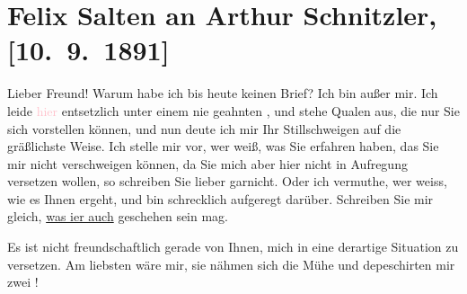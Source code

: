 

\renewcommand{\erwaehntePersonen}{Personen: Bertha Karlsburg}
\renewcommand{\erwaehnteOrte}{Orte: Hotel Stadt Pest, Miskolc, Wien}
\renewcommand{\erwaehnteWerke}{}
\section[Felix Salten an Arthur Schnitzler, {[}10. 9. 1891{]}]{Felix Salten an Arthur Schnitzler, {[}10. 9. 1891{]}}
\nopagebreak{}
\rehead{ }\normalsize\beginnumbering{}
\toendnotes[C]{\smallbreak\pagebreak[2]}
\toendnotes[C]{\smallbreak}
\pstart
           \noindent{}{\pb}Lieber Freund! Warum habe ich bis heute keinen Brief? Ich bin außer mir. Ich leide \textcolor{pink}{hier}{}\ledrightnote{{$\rightarrow$}\textcolor{pink}{Miskolc}} entsetzlich unter einem
               nie geahnten \label{K_L03104-1v}\label{K_L03104-1h}, und stehe Qualen aus, die nur Sie sich vorstellen können, und nun deute ich
               mir Ihr Stillschweigen auf die gräßlichste Weise. Ich stelle mir vor, wer weiß, was
               Sie erfahren haben,  das Sie mir nicht verschweigen
               können, da Sie mich aber hier nicht in Aufregung
               versetzen wollen, so schreiben Sie lieber garnicht. Oder ich vermuthe, wer weiss, wie
               es Ihnen  ergeht, und bin schrecklich aufgeregt
               darüber. Schreiben Sie mir gleich, \uline{was i{\geminationm}er auch} geschehen sein mag.\pend
           
\pstart
           Es ist nicht freundschaftlich gerade von {\pb}Ihnen, mich in eine
               derartige Situation zu versetzen. Am liebsten wäre mir, sie nähmen sich die Mühe und
               depeschirten mir zwei \label{K_L03104-2v}\label{K_L03104-2h}!\pend
           
